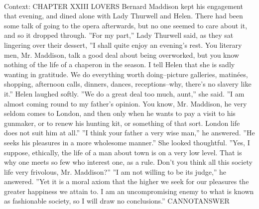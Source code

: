 \documentclass[11pt,a4paper, onecolumn]{article}
\begin{document}
\\ Context: CHAPTER XXIII LOVERS Bernard Maddison kept his engagement that evening, and dined alone with Lady Thurwell and Helen. There had been some talk of going to the opera afterwards, but no one seemed to care about it, and so it dropped through. ''For my part,'' Lady Thurwell said, as they sat lingering over their dessert, ''I shall quite enjoy an evening's rest. You literary men, Mr. Maddison, talk a good deal about being overworked, but you know nothing of the life of a chaperon in the season. I tell Helen that she is sadly wanting in gratitude. We do everything worth doing--picture galleries, matinées, shopping, afternoon calls, dinners, dances, receptions--why, there's no slavery like it.'' Helen laughed softly. ''We do a great deal too much, aunt,'' she said. ''I am almost coming round to my father's opinion. You know, Mr. Maddison, he very seldom comes to London, and then only when he wants to pay a visit to his gunmaker, or to renew his hunting kit, or something of that sort. London life does not suit him at all.'' ''I think your father a very wise man,'' he answered. ''He seeks his pleasures in a more wholesome manner.'' She looked thoughtful. ''Yes, I suppose, ethically, the life of a man about town is on a very low level. That is why one meets so few who interest one, as a rule. Don't you think all this society life very frivolous, Mr. Maddison?'' ''I am not willing to be its judge,'' he answered. ''Yet it is a moral axiom that the higher we seek for our pleasures the greater happiness we attain to. I am an uncompromising enemy to what is known as fashionable society, so I will draw no conclusions.'' CANNOTANSWER
\end{document}
